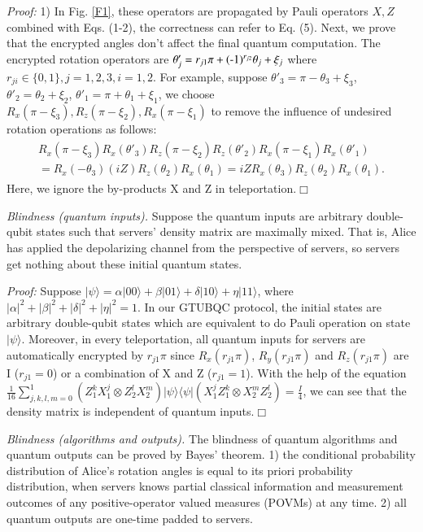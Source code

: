 \documentclass[aps,pra,showpacs,twocolumn,superscriptaddress]{revtex4-1}
\begin{document}
\emph{Proof:}
1) In Fig. \ref{F1}, these operators are propagated by Pauli operators $X, Z$ combined with Eqs. (1-2), the correctness can refer to Eq. (5). Next, we prove that the encrypted angles don't affect the final quantum computation. The encrypted rotation operators are $\theta_j'=r_{j1}\pi+(\textnormal{-}1)^{r_{j2}}\theta_j+\xi_j$ where $r_{ji}\in\{0,1\}, j=1, 2, 3, i=1, 2$. For example, suppose $\theta'_3=\pi-\theta_3+\xi_3$, $\theta'_2=\theta_2+\xi_2$, $\theta'_1=\pi+\theta_1+\xi_1$, we choose $ R_x(\pi-\xi_3), R_z(\pi-\xi_2), R_x(\pi-\xi_1)$ to remove the influence of undesired rotation operations as follows:
\begin{eqnarray*}
\begin{array}{l}
\displaystyle R_x(\pi-\xi_3)R_x(\theta'_3)R_z(\pi-\xi_2)R_z(\theta'_2)R_x(\pi-\xi_1)R_x(\theta'_1)\\
\displaystyle =R_x(-\theta_3)(iZ)R_z(\theta_2)R_x(\theta_1)=iZR_x(\theta_3)R_z(\theta_2)R_x(\theta_1).
\end{array}
\end{eqnarray*}
Here, we ignore the by-products X and Z in teleportation.$\Box$

\emph{Blindness (quantum inputs).} Suppose the quantum inputs are arbitrary double-qubit states such that servers' density matrix are maximally mixed. That is, Alice has applied the depolarizing channel from the perspective of servers, so servers get nothing about these initial quantum states.

\emph{Proof:}
Suppose $|\psi\rangle=\alpha|00\rangle+\beta|01\rangle+\delta|10\rangle+\eta|11\rangle$, where $|\alpha|^2+|\beta|^2+|\delta|^2+|\eta|^2=1.$ In our GTUBQC protocol, the initial states are arbitrary double-qubit states which are equivalent to do Pauli operation on state $|\psi\rangle$. Moreover, in every teleportation, all quantum inputs for servers are automatically encrypted by $r_{j1}\pi$ since $R_x(r_{j1}\pi)$, $R_y(r_{j1}\pi)$ and $R_z(r_{j1}\pi)$ are I ($r_{j1}=0$) or a combination of X and Z ($r_{j1}=1$). With the help of the equation $\frac{1}{16}\sum_{j,k,l,m=0}^1(Z_1^kX_1^j\otimes Z_2^lX_2^m) |\psi\rangle\langle\psi|(X_1^j Z_1^k\otimes X_2^mZ_2^l)=\frac{I}{4}$,
we can see that the density matrix is independent of quantum inputs.$\Box$

\emph{Blindness (algorithms and outputs).} The blindness of quantum algorithms and quantum outputs can be proved by Bayes' theorem. 1) the conditional probability distribution of Alice's rotation angles is equal to its priori probability distribution, when servers knows partial classical information and measurement outcomes of any positive-operator valued measures (POVMs) at any time. 2) all quantum outputs are one-time padded to servers.
\end{document}
